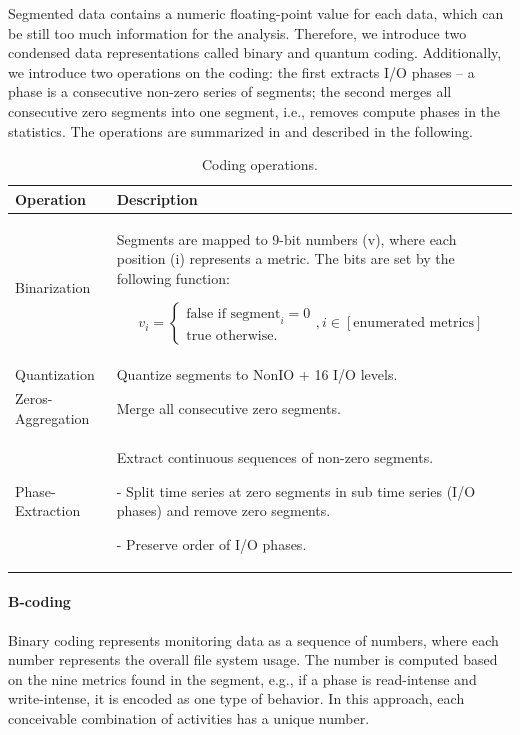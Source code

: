\documentclass{jhps}
\begin{document}
Segmented data contains a numeric floating-point value for each data, which can be still too much information for the analysis.
Therefore, we introduce two condensed data representations called binary and quantum coding.
Additionally, we introduce two operations on the coding:
the first extracts I/O phases -- a phase is a consecutive non-zero series of segments;
the second merges all consecutive zero segments into one segment, i.e., removes compute phases in the statistics.
The operations are summarized in  and described in the following.

\begin{table}[t]
 \centering
 \begin{tabularx}{\textwidth}{lX}
	 Operation &  Description \\
	 \midrule
	 Binarization & Segments are mapped to 9-bit numbers (v), where each position (i) represents a metric.
The bits are set by the following function:

	 \vbox{
		\begin{equation}
			v_i =
			\begin{cases}
				\text{false if segment}_i = 0\\\text{true otherwise.}
			\end{cases}, i \in [\text{enumerated metrics}]
		\end{equation}
	 } \\[-1em]
	 Quantization & Quantize segments to NonIO + 16 I/O levels.\\
	 Zeros-Aggregation & Merge all consecutive zero segments.\\
	 Phase-Extraction &  Extract continuous sequences of non-zero segments.
\par - Split time series at zero segments in sub time series (I/O phases) and remove zero segments.
\par - Preserve order of I/O phases.\\
 \end{tabularx}
 \caption{Coding operations.}
 \label{tab:coding_ops}
\end{table}

\paragraph{B-coding}
Binary coding represents monitoring data as a sequence of numbers, where each number represents the overall file system usage.
The number is computed based on the nine metrics found in the segment, e.g., if a phase is read-intense and write-intense, it is encoded as one type of behavior.
In this approach, each conceivable combination of activities has a unique number.
\end{document}
